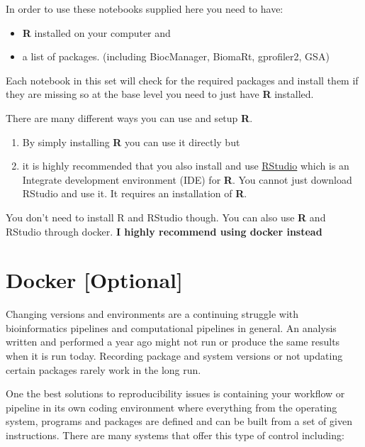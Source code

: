 \documentclass[
]{book}
\providecommand{\tightlist}{%
  \setlength{\itemsep}{0pt}\setlength{\parskip}{0pt}}
\begin{document}
In order to use these notebooks supplied here you need to have:

\begin{itemize}
\tightlist
\item
  \textbf{R} installed on your computer and
\item
  a list of packages. (including BiocManager, BiomaRt, gprofiler2, GSA)
\end{itemize}

Each notebook in this set will check for the required packages and install them if they are missing so at the base level you need to just have \textbf{R} installed.

There are many different ways you can use and setup \textbf{R}.

\begin{enumerate}
\def\labelenumi{\arabic{enumi}.}
\tightlist
\item
  By simply installing \textbf{R} you can use it directly but
\item
  it is highly recommended that you also install and use \href{https://rstudio.com/products/rstudio/download/}{RStudio} which is an Integrate development environment (IDE) for \textbf{R}. You cannot just download RStudio and use it. It requires an installation of \textbf{R}.
\end{enumerate}

You don't need to install R and RStudio though. You can also use \textbf{R} and RStudio through docker. \textbf{I highly recommend using docker instead}

\hypertarget{docker-optional}{%
\section{Docker {[}Optional{]}}\label{docker-optional}}

Changing versions and environments are a continuing struggle with bioinformatics pipelines and computational pipelines in general. An analysis written and performed a year ago might not run or produce the same results when it is run today. Recording package and system versions or not updating certain packages rarely work in the long run.

One the best solutions to reproducibility issues is containing your workflow or pipeline in its own coding environment where everything from the operating system, programs and packages are defined and can be built from a set of given instructions. There are many systems that offer this type of control including:
\end{document}
